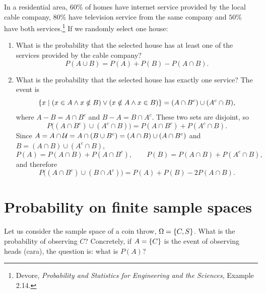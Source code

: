 \begin{exercise}
In a residential area, $60\%$ of homes have internet service provided by the local cable company, $80\%$ have television service from the same company and $50\%$ have both services.\footnote{Devore, \emph{Probability and Statistics for Engineering and the Sciences}, Example 2.14.} If we randomly select one house:
\begin{enumerate}[label=(\roman*)]
\item What is the probability that the selected house has at least one of the services provided by the cable company?
\[
P(A \cup B) = P(A) + P(B) - P(A \cap B).
\]
\item What is the probability that the selected house has exactly one service? The event is
\[
\left\{x \mid (x \in A \wedge x \notin B) \vee (x \notin A \wedge x \in B)\right\} = (A \cap B^c) \cup (A^c \cap B),
\]
where $A - B = A \cap B^c$ and $B - A = B \cap A^c$. These two sets are disjoint, so
\[
P\big((A \cap B^c) \cup (A^c \cap B)\big) = P(A \cap B^c) + P(A^c \cap B).
\]
Since $A = A \cap \mathcal{U} = A \cap (B \cup B^c) = (A \cap B) \cup (A \cap B^c)$ and $B = (A \cap B) \cup (A^c \cap B)$,
\[
P(A) = P(A \cap B) + P(A \cap B^c), \qquad P(B) = P(A \cap B) + P(A^c \cap B),
\]
and therefore
\[
P\big((A \cap B^c) \cup (B \cap A^c)\big) = P(A) + P(B) - 2P(A \cap B).
\]
\begin{center}
\end{center}
\end{enumerate}
\end{exercise}

\section{Probability on finite sample spaces}
Let us consider the sample space of a coin throw, $\Omega = \left\{C, S\right\}$. What is the probability of observing $C$? Concretely, if $A = \left\{C\right\}$ is the event of observing heads (cara), the question is: what is $P(A)$?

